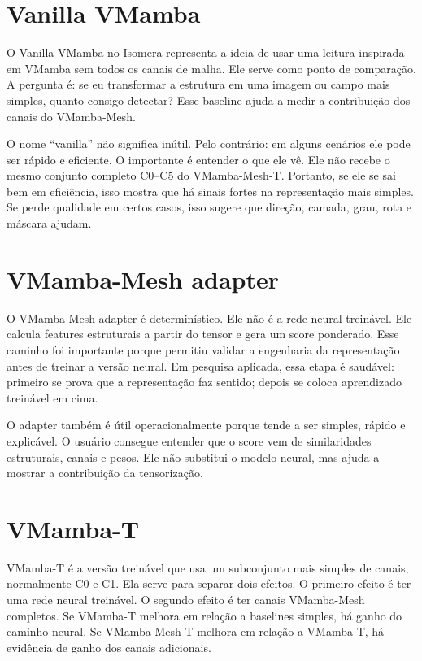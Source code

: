 \documentclass[12pt,oneside]{book}
\begin{document}
\section{Vanilla VMamba}

O Vanilla VMamba no Isomera representa a ideia de usar uma leitura inspirada em VMamba sem todos os canais de malha. Ele serve como ponto de comparação. A pergunta é: se eu transformar a estrutura em uma imagem ou campo mais simples, quanto consigo detectar? Esse baseline ajuda a medir a contribuição dos canais do VMamba-Mesh.

O nome ``vanilla'' não significa inútil. Pelo contrário: em alguns cenários ele pode ser rápido e eficiente. O importante é entender o que ele vê. Ele não recebe o mesmo conjunto completo C0--C5 do VMamba-Mesh-T. Portanto, se ele se sai bem em eficiência, isso mostra que há sinais fortes na representação mais simples. Se perde qualidade em certos casos, isso sugere que direção, camada, grau, rota e máscara ajudam.

\section{VMamba-Mesh adapter}

O VMamba-Mesh adapter é determinístico. Ele não é a rede neural treinável. Ele calcula features estruturais a partir do tensor e gera um score ponderado. Esse caminho foi importante porque permitiu validar a engenharia da representação antes de treinar a versão neural. Em pesquisa aplicada, essa etapa é saudável: primeiro se prova que a representação faz sentido; depois se coloca aprendizado treinável em cima.

O adapter também é útil operacionalmente porque tende a ser simples, rápido e explicável. O usuário consegue entender que o score vem de similaridades estruturais, canais e pesos. Ele não substitui o modelo neural, mas ajuda a mostrar a contribuição da tensorização.

\section{VMamba-T}

VMamba-T é a versão treinável que usa um subconjunto mais simples de canais, normalmente C0 e C1. Ela serve para separar dois efeitos. O primeiro efeito é ter uma rede neural treinável. O segundo efeito é ter canais VMamba-Mesh completos. Se VMamba-T melhora em relação a baselines simples, há ganho do caminho neural. Se VMamba-Mesh-T melhora em relação a VMamba-T, há evidência de ganho dos canais adicionais.
\end{document}
